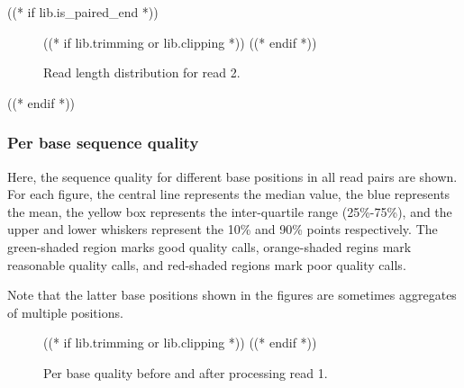 ((* if lib.is_paired_end *))
    \begin{figure}[h!]
        \centering
        \begin{minipage}[b]{0.48\textwidth}
            \centering
        \end{minipage}
        \begin{minipage}[b]{0.48\textwidth}
            \centering
            ((* if lib.trimming or lib.clipping *))
            ((* endif *))
        \end{minipage}
        \caption{Read length distribution for read 2.}
    \end{figure}
((* endif *))

\subsubsection{Per base sequence quality}
    Here, the sequence quality for different base positions in all read pairs
    are shown. For each figure, the central line represents the median value,
    the blue represents the mean, the yellow box represents the inter-quartile
    range (25\%-75\%), and the upper and lower whiskers represent the 10\% and
    90\% points respectively. The green-shaded region marks good quality calls,
    orange-shaded regins mark reasonable quality calls, and red-shaded regions
    mark poor quality calls.

    \indent

    Note that the latter base positions shown in the figures are
    sometimes aggregates of multiple positions.
    \begin{figure}[h!]
        \centering
        \begin{minipage}[b]{0.48\textwidth}
            \centering
        \end{minipage}
        \begin{minipage}[b]{0.48\textwidth}
            \centering
            ((* if lib.trimming or lib.clipping *))
            ((* endif *))
        \end{minipage}
        \caption{Per base quality before and after processing read 1.}
    \end{figure}

